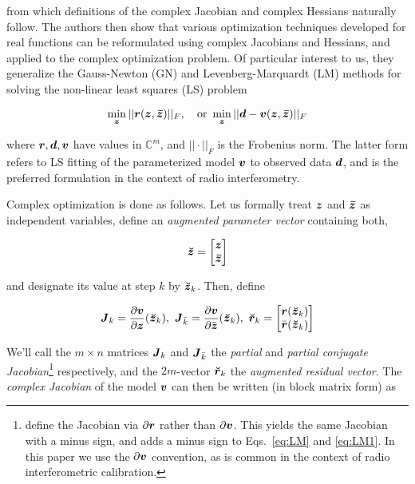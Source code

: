 \documentclass[useAMS,usenatbib]{mn2e}
\newcommand{\COMPLEX}{\mathbb{C}}
\newcommand{\zz}{\bmath{z}}
\newcommand{\zzc}{\bmath{\bar z}}
\newcommand{\rr}{\bmath{r}}
\newcommand{\vv}{\bmath{v}}
\newcommand{\mat}[1]{{\bmath{#1}}}
\newcommand{\JJ}{\mat{J}} %
\begin{document}
from which definitions of the complex Jacobian and complex Hessians naturally follow. The authors then show 
that various optimization techniques developed for real functions can be reformulated using 
complex Jacobians and Hessians, and applied to the complex optimization problem. Of particular interest to 
us, they generalize the Gauss-Newton (GN) and Levenberg-Marquardt (LM) methods for solving the non-linear 
least squares (LS) problem



\begin{equation}
\label{eq:LSmin}
\min_{\bmath{z}} ||\bmath{r}(\zz,\zzc)||_F,~~~\mathrm{or}~\min_{\bmath{z}} ||\bmath{d}-\bmath{v}(\zz,\zzc)||_F
\end{equation}

where $\bmath{r},\bmath{d},\bmath{v}$ have values in $\COMPLEX^m$, and $||\cdot||_F$ is the Frobenius norm. The latter form 
refers to LS fitting of the parameterized model $\bmath{v}$ to observed data $\bmath{d}$, and is the preferred formulation
in the context of radio interferometry.

Complex optimization is done as follows. Let us formally treat $\zz$ and $\zzc$ as independent variables, 
define an {\em augmented parameter vector} containing both, 



\[
\Zz = \Matrix{c}{\zz \\ \zzc}
\]


and designate its value at step $k$ by $\Zz_k$. Then, define


\begin{equation}
\label{eq:Jkrk}
\JJ_k=\frac{\partial \vv}{\partial \zz} (\Zz_k), ~\JJ_{\bar{k}}=\frac{\partial \vv}{\partial \bar{\zz}}(\Zz_k),~
\Rr_k=\Matrix{c}{\rr(\Zz_k)\\\bar{\rr}(\Zz_k)}
\end{equation}

We'll call the $m\times n$ matrices $\JJ_k$ and $\JJ_{\bar{k}}$ the \emph{partial} and \emph{partial conjugate 
Jacobian}\footnote{\citet{ComplexOpt} define the Jacobian via $\partial\rr$ rather than
$\partial\vv$. This yields the same Jacobian with a minus sign, and adds a minus sign to 
Eqs.~\ref{eq:LM} and \ref{eq:LM1}. In this paper we use the $\partial\vv$ convention, as is common in the
context of radio interferometric calibration.}
respectively, 
and the $2m$-vector $\Rr_k$ the \emph{augmented residual vector}. The \emph{complex Jacobian} 
of the model $\vv$ can then be written (in block matrix form) as
\end{document}
